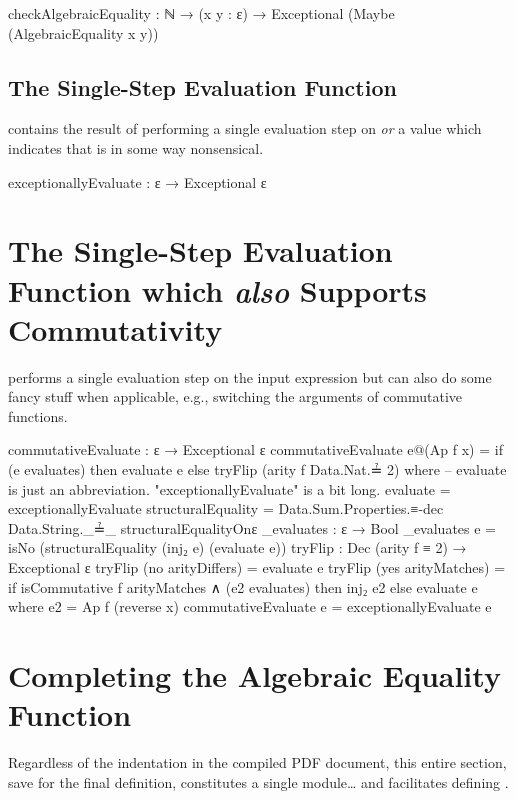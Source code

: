 \documentclass{report}
\begin{document}
\begin{code}
  checkAlgebraicEquality :
    ℕ → (x y : ε) → Exceptional (Maybe (AlgebraicEquality x y))
\end{code}

\subsection{The Single-Step Evaluation Function}
  contains the result of performing a single evaluation step on  \emph{or} a value which indicates that  is in some way nonsensical.

\begin{code}
  exceptionallyEvaluate : ε → Exceptional ε
\end{code}

\section{The Single-Step Evaluation Function which \emph{also} Supports Commutativity}
  performs a single evaluation step on the input expression but can also do some fancy stuff when applicable, e.g., switching the arguments of commutative functions.

\begin{code}
  commutativeEvaluate : ε → Exceptional ε
  commutativeEvaluate e@(Ap f x) =
    if (e evaluates) then evaluate e else tryFlip (arity f Data.Nat.≟ 2)
    where
    -- evaluate is just an abbreviation.  "exceptionallyEvaluate" is a bit long.
    evaluate = exceptionallyEvaluate
    structuralEquality =
      Data.Sum.Properties.≡-dec Data.String._≟_ structuralEqualityOnε
    _evaluates : ε → Bool
    _evaluates e = isNo (structuralEquality (inj₂ e) (evaluate e))
    tryFlip : Dec (arity f ≡ 2) → Exceptional ε
    tryFlip (no arityDiffers) = evaluate e
    tryFlip (yes arityMatches) =
      if isCommutative f arityMatches ∧ (e2 evaluates) then inj₂ e2 else evaluate e
      where e2 = Ap f (reverse x)
  commutativeEvaluate e = exceptionallyEvaluate e
\end{code}

\section{Completing the Algebraic Equality Function}
Regardless of the indentation in the compiled PDF document, this entire section, save for the final definition, constitutes a single module\ldots{} and facilitates defining .
\end{document}
